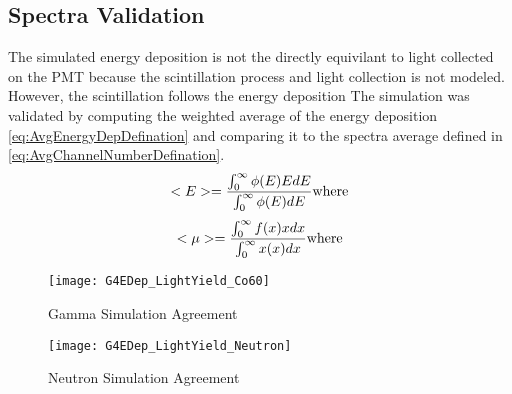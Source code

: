 \subsection{Spectra Validation}
The simulated energy deposition is not the directly equivilant to light collected on the PMT because the scintillation process and light collection is not modeled.
However, the scintillation follows the energy deposition
The simulation was validated by computing the weighted average of the energy deposition \ref{eq:AvgEnergyDepDefination} and comparing it to the spectra average defined in \ref{eq:AvgChannelNumberDefination}.
\begin{equation}
\label{eq:AvgEnergyDepDefination}
<E> = \frac{\int_0^\infty {\phi(E)EdE}}{\int_0^\infty{\phi(E)dE}} \\
\text{where}
\end{equation}
\begin{equation}
\label{eq:AvgChannelNumberDefination}
<\mu> = \frac{\int_0^\infty {f(x)xdx}}{\int_0^\infty{x(x)dx}} \\
\text{where}
\end{equation}
\begin{figure}
    \centering
    \caption{Gamma Simulation Agreement}
    \texttt{[image: G4EDep\_LightYield\_Co60]}
    \label{fig:GammaSimAgreement}
\end{figure}
\begin{figure}
    \centering
    \caption{Neutron Simulation Agreement}
    \texttt{[image: G4EDep\_LightYield\_Neutron]}
    \label{fig:NeutronSimAgreement}
\end{figure}

